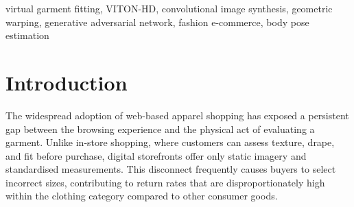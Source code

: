 \documentclass[conference]{IEEEtran}
\begin{document}
\begin{abstract}
The inability to physically assess garment fit remains a fundamental barrier in digital fashion commerce, where incorrect sizing and consequent product returns create measurable losses for both retailers and consumers. To address this, we propose an image-based garment fitting system grounded in the VITON-HD architecture, which allows users to preview clothing appearance directly on their own photographs without physical trial. Our approach structures the fitting task into three sequential operations: person-garment region extraction via semantic segmentation, spatial cloth deformation through thin-plate spline-based geometric matching, and photorealistic output synthesis using a conditional adversarial network. The Geometric Matching Module (GMM) performs body-conditioned garment warping by estimating transformation parameters aligned to the user's skeletal pose and body contour. The Try-On Module (TOM) subsequently merges the deformed garment into the source image, maintaining natural skin boundaries, fabric texture, and illumination coherence. A user-facing web interface built with Streamlit accepts arbitrary person and clothing photographs as input. Experimental evaluation confirms that the method yields perceptually convincing, high-fidelity fitting outputs across varied garment types, offering a viable solution for reducing purchase uncertainty and return frequency in online apparel retail.
\end{abstract}

\begin{IEEEkeywords}
virtual garment fitting, VITON-HD, convolutional image synthesis, geometric warping, generative adversarial network, fashion e-commerce, body pose estimation
\end{IEEEkeywords}

\section{Introduction}

The widespread adoption of web-based apparel shopping has exposed a persistent gap between the browsing experience and the physical act of evaluating a garment. Unlike in-store shopping, where customers can assess texture, drape, and fit before purchase, digital storefronts offer only static imagery and standardised measurements. This disconnect frequently causes buyers to select incorrect sizes, contributing to return rates that are disproportionately high within the clothing category compared to other consumer goods.
\end{document}
